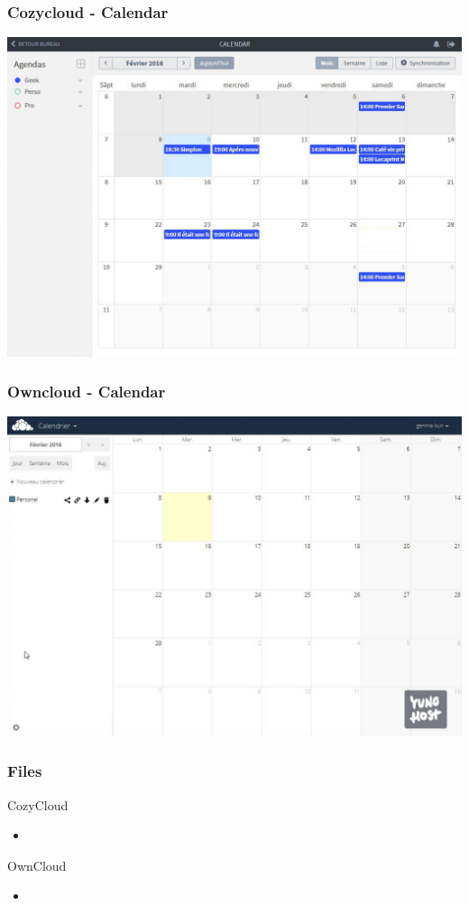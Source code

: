 \documentclass{beamer}
\begin{document}
\begin{frame}
\frametitle{Cozycloud - Calendar}
\includegraphics[scale=0.3] {./CozyCloud/CozyCloud_Calendar.jpg}
\end{frame}

\begin{frame}
\frametitle{Owncloud - Calendar}
\includegraphics[scale=0.3] {./Owncloud/Owncloud_Calendrier.jpg}
\end{frame}

\begin{frame}
\frametitle{Files}

\begin{block}{CozyCloud}
\begin{itemize}
\item 
\end{itemize}
\end{block}

\begin{block}{OwnCloud}
\begin{itemize}
\item 
\end{itemize}
\end{block}
\end{frame}
\end{document}

